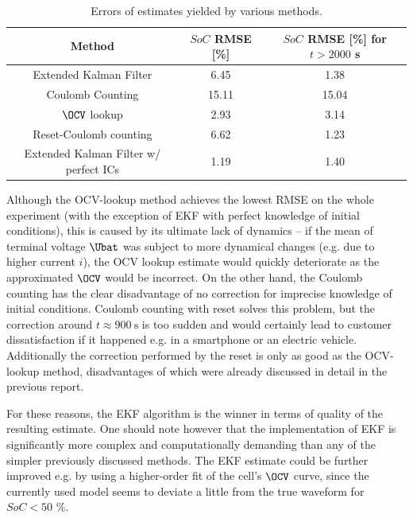 \begin{table}[t]
    \centering
    \begin{tabular}{c|c|c}
         Method & $SoC$ RMSE [\%]& $SoC$ RMSE [\%] for $t > 2000$ s \\ \hline
         Extended Kalman Filter & 6.45 & 1.38 \\
         Coulomb Counting & 15.11 & 15.04 \\
         $\OCV$ lookup & 2.93 & 3.14 \\
         Reset-Coulomb counting & 6.62 & 1.23 \\ \hline
         Extended Kalman Filter w/ perfect ICs & 1.19 & 1.40 \\
    \end{tabular}
    \caption{Errors of estimates yielded by various methods.}
    \label{tab:8-comparison}
\end{table}

Although the OCV-lookup method achieves the lowest RMSE on the whole experiment (with the exception of EKF with perfect knowledge of initial conditions), this is caused by its ultimate lack of dynamics -- if the mean of terminal voltage $\Ubat$ was subject to more dynamical changes (e.g. due to higher current $i$), the OCV lookup estimate would quickly deteriorate as the approximated $\OCV$ would be incorrect. On the other hand, the Coulomb counting has the clear disadvantage of no correction for imprecise knowledge of initial conditions. Coulomb counting with reset solves this problem, but the correction around $t \approx \SI{900}{\second}$ is too sudden and would certainly lead to customer dissatisfaction if it happened e.g. in a smartphone or an electric vehicle. Additionally the correction performed by the reset is only as good as the OCV-lookup method, disadvantages of which were already discussed in detail in the previous report.

For these reasons, the EKF algorithm is the winner in terms of quality of the resulting estimate. One should note however that the implementation of EKF is significantly more complex and computationally demanding than any of the simpler previously discussed methods.
The EKF estimate could be further improved e.g. by using a higher-order fit of the cell's $\OCV$ curve, since the currently used model seems to deviate a little from the true waveform for $SoC < 50$ \%.





